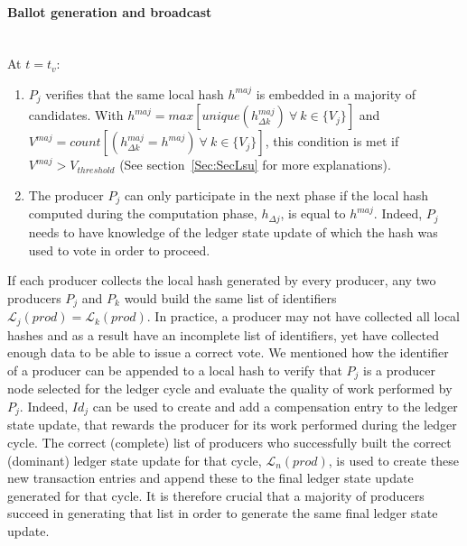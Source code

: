 \paragraph{Ballot generation and broadcast}\mbox{}\\
At $t = t_v$:
\begin{enumerate}
\item $P_j$ verifies that the same local hash $h^{maj}$ is embedded in a majority of candidates. With $h^{maj} = max[unique(h^{maj}_{\Delta k})~\forall~k\in\{V_j\}]$ and $V^{maj} = count[(h^{maj}_{\Delta k} = h^{maj})~\forall~k\in\{V_j\}]$, this condition is met if $V^{maj}  > V_{threshold}$ (See section~\ref{Sec:SecLsu} for more explanations). 
\item The producer $P_j$ can only participate in the next phase if the local hash computed during the computation phase, $h_{\Delta j}$, is equal to $h^{maj}$. Indeed, $P_j$ needs to have knowledge of the ledger state update of which the hash was used to vote in order to proceed. 
\end{enumerate}
 
If each producer collects the local hash generated by every producer, any two producers $P_j$ and $P_k$ would build the same list of identifiers $\mathcal{L}_j(prod) = \mathcal{L}_k(prod)$. In practice, a producer may not have collected all local hashes and as a result have an incomplete list of identifiers, yet have collected enough data to be able to issue a correct vote. We mentioned how the identifier of a producer can be appended to a local hash to verify that $P_j$ is a producer node selected for the ledger cycle and evaluate the quality of work performed by $P_j$. Indeed, $Id_j$ can be used to create and add a compensation entry to the ledger state update, that rewards the producer for its work performed during the ledger cycle. The correct (complete) list of producers who successfully built the correct (dominant) ledger state update for that cycle, $\mathcal{L}_n(prod)$,  is used to create these new transaction entries and append these to the final ledger state update generated for that cycle. It is therefore crucial that a majority of producers succeed in generating that list in order to generate the same final ledger state update. \\ 


